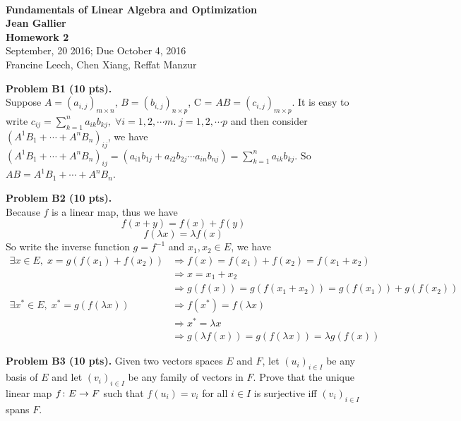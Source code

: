 \documentclass[12pt]{article}
\begin{document}
\begin{center}
\\
\vspace{1cm}
{\Large\bf Fundamentals of Linear Algebra and Optimization\\
Jean Gallier \\
\vspace{0.5cm}
Homework 2}\\[10pt]
September, 20 2016; Due October 4, 2016\\
Francine Leech, Chen Xiang, Reffat Manzur
\end{center}


\vspace {0.25cm}\noindent
{\bf Problem B1 (10 pts).} \\
Suppose $A = (a_{i,j})_{m \times n}$, $B = (b_{i,j})_{n \times p}$, C = $AB = (c_{i,j})_{m \times p}$.
It is easy to write $c_{ij} = \sum_{k=1}^{n} a_{ik} b_{kj},\; \forall i = 1,2,\cdots m.\; j = 1,2,\cdots p$ 
and then consider $(A^1B_1 + \cdots + A^nB_n)_{ij}$, we have $  (A^1B_1 + \cdots + A^nB_n)_{ij} = (a_{i1}b_{1j} + a_{i2}b_{2j} \cdots a_{in}b_{nj}) = \sum_{k=1}^{n} a_{ik} b_{kj}$. So $AB = A^1B_1 + \cdots + A^nB_n$.


\vspace {0.25cm}\noindent
{\bf Problem B2 (10 pts).} \\
Because $f$ is a linear map, thus we have 
\[
f(x + y) = f(x) + f(y)
\]
\[
f(\lambda x) = \lambda f(x)
\]
So write the inverse function $g = f^{-1}$ and $x_1,x_2 \in E$, we have 
\begin{align*}
\exists x \in E , \; x = g(f(x_1) + f(x_2)) &\Rightarrow 
f(x) = f(x_1) + f(x_2) = f(x_1 + x_2) \\
&\Rightarrow x = x_1 + x_2 \\
&\Rightarrow g(f(x)) = g(f(x_1 + x_2)) = g(f(x_1)) + g(f(x_2)) \\
\exists x^* \in E, \; x^* = g(f(\lambda x)) &\Rightarrow f(x^*) = f(\lambda x) \\
&\Rightarrow x^* = \lambda x \\
&\Rightarrow g(\lambda f(x)) = g(f(\lambda x)) = \lambda g(f(x))
\end{align*}



\vspace {0.25cm}\noindent
{\bf Problem B3 (10 pts).}
Given two vectors spaces $E$ and $F$, let $(u_i)_{i\in I}$
be any basis of $E$ and let $(v_i)_{i\in I}$ be any
family of vectors in $F$. Prove that the unique linear map
$f\colon E\rightarrow F$ such that $f(u_i) = v_i$ for all $i\in I$ 
is surjective iff  $(v_i)_{i\in I}$ spans $F$.
\end{document}
